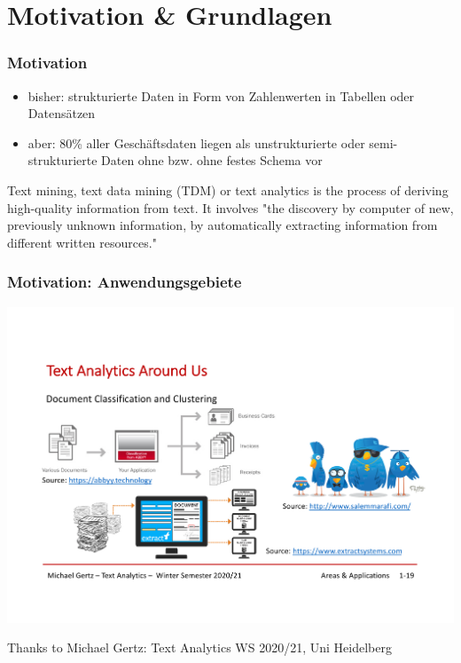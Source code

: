 \section{Motivation \& Grundlagen}

\begin{frame}
    \frametitle{Motivation}

    \begin{itemize}
        \item bisher: strukturierte Daten in Form von Zahlenwerten in Tabellen oder Datensätzen
        \item aber: 80\% aller Geschäftsdaten liegen als unstrukturierte oder semi-strukturierte Daten ohne bzw. ohne festes Schema vor
    \end{itemize}   

    \vspace*{1cm}
    {\small
    \begin{notebox}
    Text mining, text data mining (TDM) or text analytics is the process of deriving high-quality information from text. It involves "the discovery by computer of new, previously unknown information, by automatically extracting information from different written resources."\\
    \xspace [Source: Wikipedia]
    \end{notebox}
    }

\end{frame}


\begin{frame}[c]
    \frametitle{Motivation: Anwendungsgebiete}

    \begin{center}
    \includegraphics[width=\textwidth]{fig8/motivation-1.pdf}
    \end{center}

\small{Thanks to Michael Gertz: Text Analytics WS 2020/21, Uni Heidelberg}
\end{frame}

